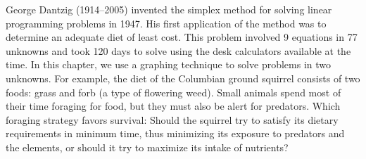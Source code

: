 \documentclass[10pt,]{book}
\theoremstyle{plain}
\theoremstyle{definition}
\theoremstyle{definition}
\theoremstyle{definition}
\theoremstyle{definition}
\numberwithin{equation}{section}
\newcounter{figstack}
\newcounter{figindex}
\newlength\fight
\newcommand\pushValignCaptionBottom[5][b]{%
\stepcounter{figstack}%
\expandafter\def\csname %
figalign\romannumeral\value{figstack}\endcsname{#1}%
\expandafter\def\csname %
figtype\romannumeral\value{figstack}\endcsname{#2}%
\expandafter\def\csname %
figwd\romannumeral\value{figstack}\endcsname{#3}%
\expandafter\def\csname %
figcontent\romannumeral\value{figstack}\endcsname{#4}%
\expandafter\def\csname %
figcap\romannumeral\value{figstack}\endcsname{#5}%
\setbox0=\hbox{%
\begin{#2}{#3}#4\end{#2}}%
\ifdim\dimexpr\ht0+\dp0\relax>\fight\global\setlength{\fight}{%
\dimexpr\ht0+\dp0\relax}\fi%
}
\newcommand\popValignCaptionBottom{%
\setcounter{figindex}{0}%
\hfill%
\whiledo{\value{figindex}<\value{figstack}}{%
\stepcounter{figindex}%
\def\tmp{\csname figwd\romannumeral\value{figindex}\endcsname}%
\begin{\csname figtype\romannumeral\value{figindex}\endcsname}[t]{\tmp}%
\centering%
\stackinset{c}{}%
{\csname figalign\romannumeral\value{figindex}\endcsname}{}%
{\csname figcontent\romannumeral\value{figindex}\endcsname}%
{\rule{0pt}{\fight}}\par%
\csname figcap\romannumeral\value{figindex}\endcsname%
\end{\csname figtype\romannumeral\value{figindex}\endcsname}%
\hfill%
}%
\setcounter{figstack}{0}%
\setlength{\fight}{0pt}%
\hfill%
}
\begin{document}
	George Dantzig (1914–2005) invented the simplex method for solving linear programming problems in 1947. His first application of the method was to determine an adequate diet of least cost. This problem involved 9 equations in 77 unknowns and took 120 days to solve using the desk calculators available at the time. In this chapter, we use a graphing technique to solve problems in two unknowns. For example, the diet of the Columbian ground squirrel consists of two foods: grass and forb (a type of flowering weed). Small animals spend most of their time foraging for food, but they must also be alert for predators. Which foraging strategy favors survival: Should the squirrel try to satisfy its dietary requirements in minimum time, thus minimizing its exposure to predators and the elements, or should it try to maximize its intake of nutrients?
%
\leavevmode%
\par
\end{document}
